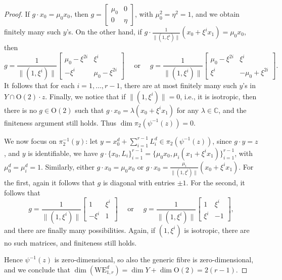 \documentclass[10pt,a4paper]{amsart}
\newcommand{\CC}{\mathbb{C}}
\begin{document}
\begin{proof}
    If $g\cdot x_0=\mu_0 x_0$, then $g=\begin{bmatrix}
        \mu_0 &0\\
        0&\eta
    \end{bmatrix}$, with $\mu_0^2=\eta^2=1$, and we obtain finitely many such $y$'s. On the other hand, if $g\cdot \frac{1}{\|(1,\xi^i)\|}(x_0+\xi^ix_1)=\mu_0 x_0$, then 
    $$
    g=\frac{1}{\|(1,\xi^i)\|}\begin{bmatrix}
       \mu_0-\xi^{2i}&\xi^i\\
       -\xi^i&\mu_0-\xi^{2i}
    \end{bmatrix} \quad \text{ or } \quad g=\frac{1}{\|(1,\xi^i)\|}\begin{bmatrix}
       \mu_0-\xi^{2i}&\xi^i\\
       \xi^i&-\mu_0+\xi^{2i}
    \end{bmatrix}.
    $$
   It follows that for each $i=1,\dots, r-1$, there are at most finitely many such $y$'s in $Y\cap \mathrm{O}(2)\cdot z$. Finally, we notice that if $\|(1,\xi^i)\|=0$, i.e., it is isotropic, then there is no $g\in \mathrm{O}(2)$ such that $g\cdot x_0=\lambda (x_0+\xi^ix_1)$ for any $\lambda\in \CC$, and the finiteness argument still holds. Thus $\dim \pi_2(\psi^{-1}(z))=0$.

    We now focus on $\pi_2^{-1}(y)$: let $y=x_0^d+\sum_{i=1}^{r-1}L_i^d\in \pi_2(\psi^{-1}(z))$, since $g\cdot y=z$, and $y$ is identifiable, we have $g\cdot \{x_0,L_i\}_{i=1}^{r-1}=\{\mu_0x_0,\mu_i(x_1+\xi^ix_1)\}_{i=1}^{r-1}$, with $\mu_0^d=\mu_i^d=1$. Similarly, either $g\cdot x_0=\mu_0x_0$ or $g\cdot x_0=\frac{\mu_i}{\|(1,\xi^i)\|}(x_0+\xi^ix_1)$. For the first, again it follows that $g$ is diagonal with entries $\pm 1$. For the second, it follows that
  $$
 g=\frac{1}{\|(1,\xi^i)\|}\begin{bmatrix}
        1&\xi^i\\
        -\xi^i&1
    \end{bmatrix} \quad \text{ or }  \quad g=\frac{1}{\|(1,\xi^i)\|}\begin{bmatrix}
        1&\xi^i\\
        \xi^i&-1
    \end{bmatrix} ,$$  
    and there are finally many possibilities. Again, if $(1,\xi^i)$ is isotropic, there are no such matrices, and finiteness still holds.

   Hence $\psi^{-1}(z)$ is zero-dimensional, so also the generic fibre is zero-dimensional, and we conclude that $\dim(\mathrm{WE}_{1,r}^d)=\dim Y+\dim \mathrm{O}(2)=2(r-1)$.
    \end{proof}
\end{document}

